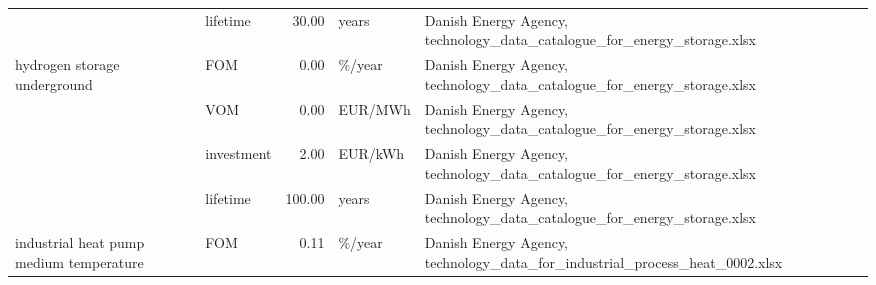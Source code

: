 \begin{longtable}{p{5cm}p{3cm}rp{3cm}p{11cm}}
                      & lifetime &          30.00 &                             years &                                                                                                                                                                                                                                                              Danish Energy Agency, technology\_data\_catalogue\_for\_energy\_storage.xlsx \\
hydrogen storage underground & FOM &           0.00 &                            \%/year &                                                                                                                                                                                                                                                              Danish Energy Agency, technology\_data\_catalogue\_for\_energy\_storage.xlsx \\
                      & VOM &           0.00 &                           EUR/MWh &                                                                                                                                                                                                                                                              Danish Energy Agency, technology\_data\_catalogue\_for\_energy\_storage.xlsx \\
                      & investment &           2.00 &                           EUR/kWh &                                                                                                                                                                                                                                                              Danish Energy Agency, technology\_data\_catalogue\_for\_energy\_storage.xlsx \\
                      & lifetime &         100.00 &                             years &                                                                                                                                                                                                                                                              Danish Energy Agency, technology\_data\_catalogue\_for\_energy\_storage.xlsx \\
industrial heat pump medium temperature & FOM &           0.11 &                            \%/year &                                                                                                                                                                                                                                                          Danish Energy Agency, technology\_data\_for\_industrial\_process\_heat\_0002.xlsx \\

\end{longtable}
